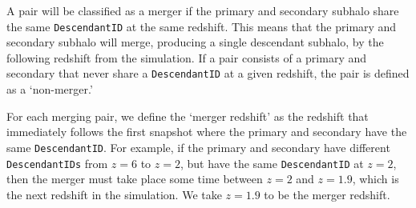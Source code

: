 \documentclass[twocolumn,linenumbers]{aastex631}
\begin{document}
A pair will be classified as a merger if the primary and secondary subhalo share the same \texttt{DescendantID} at the same redshift. 
This means that the primary and secondary subhalo will merge, producing a single descendant subhalo, by the following redshift from the simulation.
If a pair consists of a primary and secondary that never share a \texttt{DescendantID} at a given redshift, the pair is defined as a `non-merger.'

For each merging pair, we define the `merger redshift' as the redshift that immediately follows the first snapshot where the primary and secondary have the same \texttt{DescendantID}. 
For example, if the primary and secondary have different \texttt{DescendantIDs} from $z=6$ to $z=2$, but have the same \texttt{DescendantID} at $z=2$, then the merger must take place some time between $z=2$ and $z=1.9$, which is the next redshift in the simulation. 
We take $z=1.9$ to be the merger redshift. 
\end{document}
